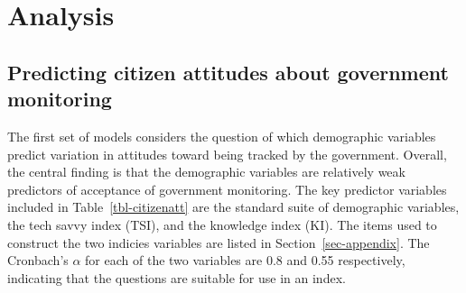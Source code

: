 \documentclass[
  letterpaper,
  DIV=11,
  numbers=noendperiod]{scrartcl}
\begin{document}
\section{Analysis}\label{sec-analysis}

\subsection{Predicting citizen attitudes about government
monitoring}\label{predicting-citizen-attitudes-about-government-monitoring}

The first set of models considers the question of which demographic
variables predict variation in attitudes toward being tracked by the
government. Overall, the central finding is that the demographic
variables are relatively weak predictors of acceptance of government
monitoring. The key predictor variables included in
Table~\ref{tbl-citizenatt} are the standard suite of demographic
variables, the tech savvy index (TSI), and the knowledge index (KI). The
items used to construct the two indicies variables are listed in
Section~\ref{sec-appendix}. The Cronbach's \(\alpha\) for each of the
two variables are 0.8 and 0.55 respectively, indicating that the
questions are suitable for use in an index.
\end{document}

